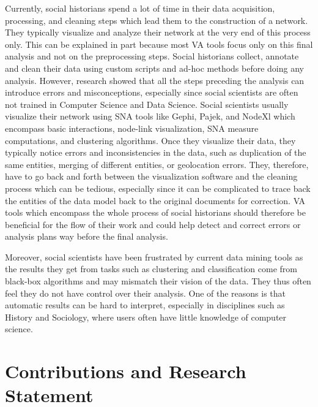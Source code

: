 Currently, social historians spend a lot of time in their data acquisition, processing, and cleaning steps which lead them to the construction of a network.
They typically visualize and analyze their network at the very end of this process only.
This can be explained in part because most VA tools focus only on this final analysis and not on the preprocessing steps.
Social historians collect, annotate and clean their data using custom scripts and ad-hoc methods before doing any analysis.
However, research showed that all the steps preceding the analysis can introduce errors and misconceptions, especially since social scientists are often not trained in Computer Science and Data Science\cite{lemercier12FormalNetwork2015, alkadi2022}.
Social scientists usually visualize their network using SNA tools like Gephi\cite{Gephi}, Pajek\cite{pajek}, and NodeXl\cite{noauthor_nodexl_nodate} which encompass basic interactions, node-link visualization, SNA measure computations, and clustering algorithms.
Once they visualize their data, they typically notice errors and inconsistencies in the data, such as duplication of the same entities, merging of different entities, or geolocation errors.
They, therefore, have to go back and forth between the visualization software and the cleaning process which can be tedious, especially since it can be complicated to trace back the entities of the data model back to the original documents for correction.
VA tools which encompass the whole process of social historians should therefore be beneficial for the flow of their work and could help detect and correct errors or analysis plans way before the final analysis.

Moreover, social scientists have been frustrated by current data mining tools as the results they get from tasks such as clustering and classification come from black-box algorithms and may mismatch their vision of the data.
They thus often feel they do not have control over their analysis\cite{lepetitHistoireQuantitativeDeux1989}.
One of the reasons is that automatic results can be hard to interpret, especially in disciplines such as History and Sociology, where users often have little knowledge of computer science.



\section{Contributions and Research Statement}\label{sec:contribution-and-research-statement}


